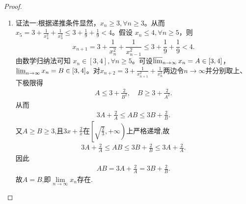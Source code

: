 \documentclass[../../main.tex]{subfiles}%
\begin{document}
\begin{proof}
\begin{enumerate}
\begin{align*}
&A=\lim_{k\rightarrow \infty} a_{n_k+2}=\lim_{k\rightarrow \infty} \frac{1}{a_{n_k+1}}+\lim_{k\rightarrow \infty} \frac{1}{a_{n_k}}
\\
&=\frac{1}{l_1}+\frac{1}{l_2}\leqslant \frac{1}{B}+\frac{1}{B}=\frac{2}{B}=A\Rightarrow l_1=l_2=B.
\end{align*}
同理再对$a_{n_k+1}=\frac{1}{a_{n_k}}+\frac{1}{a_{n_k-1}}$等式两边同时关于$k\to+\infty$取极限,再结合$B\leqslant  l_1,l_2,l_3\leqslant  A$得到
\begin{align*}
&B=l_1=\lim_{k\rightarrow \infty} a_{n_k+1}=\lim_{k\rightarrow \infty} \frac{1}{a_{n_k}}+\lim_{k\rightarrow \infty} \frac{1}{a_{n_k-1}}
\\
&=\frac{1}{l_2}+\frac{1}{l_3}\geqslant \frac{1}{A}+\frac{1}{A}=\frac{2}{A}=B\Rightarrow l_2=l_3=A.
\end{align*}
故$A=B=l_1=l_2=l_3$,又由于$AB=2$,因此$\underset{n\rightarrow \infty}{{\varlimsup }}a_n=\underset{n\rightarrow \infty}{{\varliminf }}a_n=A=B=\sqrt{2}$.即$\underset{n\rightarrow \infty}{\lim}a_n=\sqrt{2}$.

\item {\color{blue}证法一:}根据递推条件显然，\(x_n\geqslant 3,\forall n\geqslant 3\)。从而 \(x_5 = 3+\frac{1}{x_{4}^{2}}+\frac{1}{x_{3}^{2}}\leqslant 3+\frac{1}{9}+\frac{1}{9}<4\)。假设 \(x_n\leqslant 4,\forall n\geqslant 5\)，则
\[
x_{n + 1}=3+\frac{1}{x_{n}^{2}}+\frac{1}{x_{n - 1}^{2}}\leqslant 3+\frac{1}{9}+\frac{1}{9}<4.
\]
由数学归纳法可知 \(x_n\in [3,4],\forall n\geqslant 5\)。可设$\varlimsup_{n\rightarrow \infty}x_n=A\in [3,4]$，$\varliminf_{n\rightarrow \infty}x_n=B\in [3,4]$。对$x_{n+2}=3+\frac{1}{x_{n+1}^{2}}+\frac{1}{x_{n}^{2}}$两边令$n\rightarrow \infty$并分别取上、下极限得
\begin{align*}
A\leqslant 3+\frac{2}{B^2},\quad B\geqslant 3+\frac{2}{A^2}.
\end{align*}
从而
\begin{align*}
3A+\frac{2}{A}\leqslant AB\leqslant 3B+\frac{2}{B}.
\end{align*}
又$A\geqslant B\geqslant 3$,且$3x+\frac{2}{x}$在$\left[ \sqrt{\frac{2}{3}},+\infty \right)$上严格递增,故
\begin{align*}
3A+\frac{2}{A}\leqslant AB\leqslant 3B+\frac{2}{B}\leqslant 3A+\frac{2}{A}.
\end{align*}
因此
\begin{align*}
AB=3A+\frac{2}{A}=3B+\frac{2}{B}.
\end{align*}
故$A=B$,即$\underset{n\rightarrow \infty}{\lim}x_n$存在.


\end{enumerate}
\end{proof}
\end{document}
